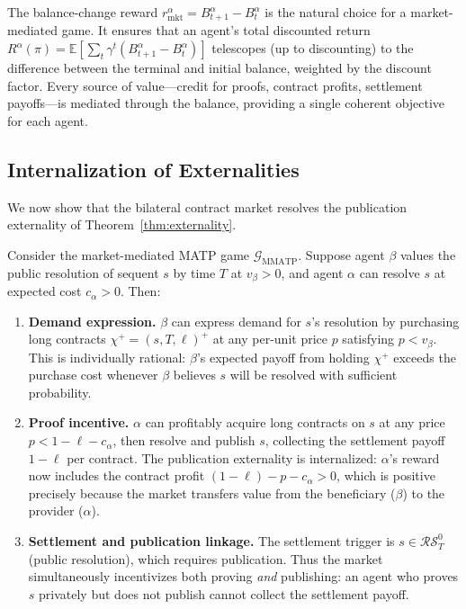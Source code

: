 \begin{remark}
The balance-change reward $r^\alpha_{\mathrm{mkt}} = B^\alpha_{t+1} - B^\alpha_t$ is the natural choice for a market-mediated game. It ensures that an agent's total discounted return $R^\alpha(\pi) = \mathbb{E}[\sum_t \gamma^t(B^\alpha_{t+1}-B^\alpha_t)]$ telescopes (up to discounting) to the difference between the terminal and initial balance, weighted by the discount factor. Every source of value---credit for proofs, contract profits, settlement payoffs---is mediated through the balance, providing a single coherent objective for each agent.
\end{remark}


\subsection{Internalization of Externalities}\label{sec:internalization}

We now show that the bilateral contract market resolves the publication externality of Theorem~\ref{thm:externality}.

\begin{theorem}\label{thm:internalization}
Consider the market-mediated MATP game $\mathcal{G}_{\mathrm{MMATP}}$. Suppose agent $\beta$ values the public resolution of sequent $s$ by time $T$ at $v_\beta > 0$, and agent $\alpha$ can resolve $s$ at expected cost $c_\alpha > 0$. Then:
\begin{enumerate}
    \item \textbf{Demand expression.} $\beta$ can express demand for $s$'s resolution by purchasing long contracts $\chi^+ = (s,T,\ell)^+$ at any per-unit price $p$ satisfying $p < v_\beta$. This is individually rational: $\beta$'s expected payoff from holding $\chi^+$ exceeds the purchase cost whenever $\beta$ believes $s$ will be resolved with sufficient probability.
    
    \item \textbf{Proof incentive.} $\alpha$ can profitably acquire long contracts on $s$ at any price $p < 1-\ell - c_\alpha$, then resolve and publish $s$, collecting the settlement payoff $1-\ell$ per contract. The publication externality is internalized: $\alpha$'s reward now includes the contract profit $(1-\ell) - p - c_\alpha > 0$, which is positive precisely because the market transfers value from the beneficiary ($\beta$) to the provider ($\alpha$).
    
    \item \textbf{Settlement and publication linkage.} The settlement trigger is $s\in\mathcal{RS}^0_T$ (public resolution), which requires publication. Thus the market simultaneously incentivizes both proving \emph{and} publishing: an agent who proves $s$ privately but does not publish cannot collect the settlement payoff.
\end{enumerate}
\end{theorem}

